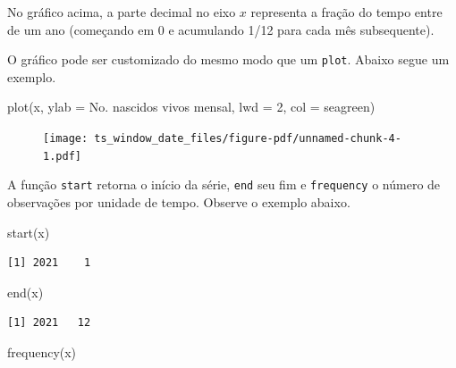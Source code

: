 \documentclass[
  letterpaper,
  DIV=11,
  numbers=noendperiod]{scrartcl}
\newenvironment{Shaded}{\begin{snugshade}}{\end{snugshade}}
\newcommand{\AttributeTok}[1]{\textcolor[rgb]{0.40,0.45,0.13}{#1}}
\newcommand{\DecValTok}[1]{\textcolor[rgb]{0.68,0.00,0.00}{#1}}
\newcommand{\FunctionTok}[1]{\textcolor[rgb]{0.28,0.35,0.67}{#1}}
\newcommand{\NormalTok}[1]{\textcolor[rgb]{0.00,0.23,0.31}{#1}}
\newcommand{\StringTok}[1]{\textcolor[rgb]{0.13,0.47,0.30}{#1}}
\theoremstyle{plain}
\theoremstyle{plain}
\theoremstyle{definition}
\theoremstyle{definition}
\theoremstyle{remark}
\begin{document}
No gráfico acima, a parte decimal no eixo \(x\) representa a fração do
tempo entre de um ano (começando em 0 e acumulando 1/12 para cada mês
subsequente).

O gráfico pode ser customizado do mesmo modo que um \texttt{plot}.
Abaixo segue um exemplo.

\begin{Shaded}
\begin{Highlighting}[]
\FunctionTok{plot}\NormalTok{(x, }\AttributeTok{ylab =} \StringTok{\textquotesingle{}No. nascidos vivos mensal\textquotesingle{}}\NormalTok{, }\AttributeTok{lwd =} \DecValTok{2}\NormalTok{, }\AttributeTok{col =} \StringTok{\textquotesingle{}seagreen\textquotesingle{}}\NormalTok{)}
\end{Highlighting}
\end{Shaded}

\begin{figure}[H]

{\centering \texttt{[image: ts\_window\_date\_files/figure-pdf/unnamed-chunk-4-1.pdf]}

}

\end{figure}

A função \texttt{start} retorna o início da série, \texttt{end} seu fim
e \texttt{frequency} o número de observações por unidade de tempo.
Observe o exemplo abaixo.

\begin{Shaded}
\begin{Highlighting}[]
\FunctionTok{start}\NormalTok{(x)}
\end{Highlighting}
\end{Shaded}

\begin{verbatim}
[1] 2021    1
\end{verbatim}

\begin{Shaded}
\begin{Highlighting}[]
\FunctionTok{end}\NormalTok{(x)}
\end{Highlighting}
\end{Shaded}

\begin{verbatim}
[1] 2021   12
\end{verbatim}

\begin{Shaded}
\begin{Highlighting}[]
\FunctionTok{frequency}\NormalTok{(x)}
\end{Highlighting}
\end{Shaded}
\end{document}

